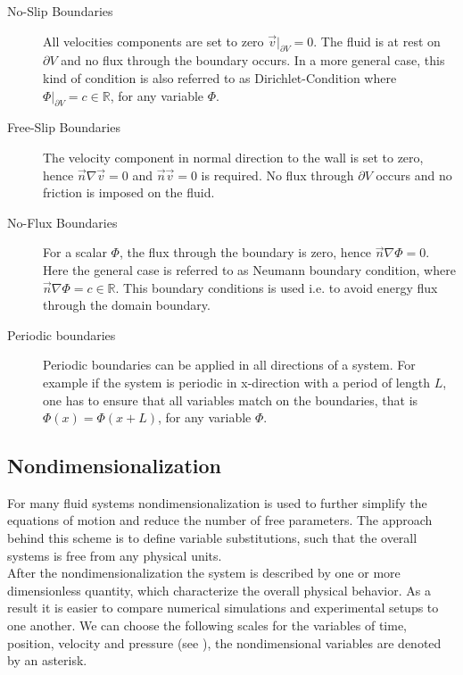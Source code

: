 \begin{description}
    \item[No-Slip Boundaries] All velocities components are set to zero $\vec{v}|_{\partial V} = 0$. The fluid is at rest on $\partial V$ and no flux through
                              the boundary occurs.
                              In a more general case, this kind of condition is  also referred to as Dirichlet-Condition where $\Phi|_{\partial V} = c\in\mathbb{R} $,
                              for any variable $\Phi$.

    \item[Free-Slip Boundaries] The velocity component in normal direction to the wall is set to zero, hence $\vec{n} \nabla \vec{v} = 0$ and $\vec{n}\vec{v}=0$ is required.
                                No flux through $\partial V$ occurs and no friction is imposed on the fluid.

    \item[No-Flux Boundaries] For a scalar $\Phi$, the flux through the boundary is zero, hence $\vec{n}\nabla \Phi = 0$.
                              Here the general case is referred to as Neumann boundary condition, where $\vec{n}\nabla \Phi = c\in \mathbb{R}$.
                              This boundary conditions is used i.e. to avoid energy flux through the domain boundary.

    \item[Periodic boundaries] Periodic boundaries can be applied in all directions of a system. For example if the system is periodic in x-direction with a period of length $L$,
                                one has to ensure that all variables match on the boundaries, that is $\Phi(x) = \Phi(x + L)$, for any variable $\Phi$.
\end{description}

\subsection{Nondimensionalization}

For many fluid systems nondimensionalization is used to further simplify the equations of motion and reduce the number of free parameters.
The approach behind this scheme is to define variable substitutions, such that the overall systems is free from any physical units.\\
After the nondimensionalization the system is described by one or more dimensionless quantity, which characterize the overall physical behavior.
As a result it is easier to compare numerical simulations and experimental setups to one another.
We can choose the following scales for the variables of time, position, velocity and pressure (see \cite{Kundu2012}), the nondimensional variables are denoted by an asterisk.

